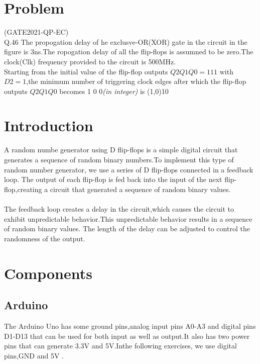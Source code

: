 \documentclass[10pt,a4paper]{article}
\title{\mytitle}
\author{\myauthor\hspace{1em}\\\contact\\FWC22120        IITH-Future Wireless Communications     Assignment    -1\hspace{0.5em}\hspace{0.5em}\mymodule}
\date{}
\begin{document}
\maketitle
\tableofcontents

\section{Problem}
(GATE2021-QP-EC)\\
Q.46 The propogation delay of he exclusve-OR(XOR) gate in the circuit in the figure is 3ns.The ropogation delay of all the flip-flops is assumned to be zero.The clock(Clk) frequency provided to the circuit is 500MHz.\\

Starting from the initial value of the flip-flop outputs $Q2Q1Q0 =111$ with $D2=1$,the minimum number of triggering clock edges after which the flip-flop outputs $Q2Q1Q0$ becomes 1 0 0\emph{(in integer)} is \line(1,0){10}

\section{Introduction}
A random numbe generator using D flip-flops is a simple digital circuit that generates a sequence of random binary numbers.To implement this type of random number generator, we use a series of D flip-flops connected in a feedback loop. The output of each flip-flop is fed back into the input of the next flip-flop,creating a circuit that generated a sequence of random binary values.\\ \\
The feedback loop creates a delay in the circuit,which causes the circuit to exhibit unpredictable behavior.This unpredictable behavior results in a sequence of random binary values. The length of the delay can be adjusted to control the randomness of the output.

\section{Components}




\subsection{Arduino} \vspace{5mm}
The Arduino Uno has some ground pins,analog input pins A0-A3 and digital pins D1-D13 that can be used for both input as well as output.It also has two power pins that can generate 3.3V and 5V.Inthe following exercises, we use digital pins,GND and 5V .
\end{document}
